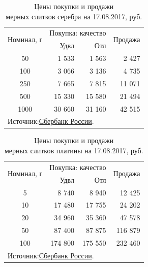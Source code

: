 \documentclass[_Banking_p3.tex]{subfiles}
\begin{document}
\begin{frame}[shrink=25]
\begin{table}[htbp]
  \centering
  \caption{Цены покупки и продажи\\ мерных слитков серебра на 17.08.2017, руб.}
    \begin{tabular}{crrr}
    \toprule
   
	\multirow{2}[4]{*}{ Номинал, г} & \multicolumn{2}{c}{Покупка: качество} & 				\multirow{2}[4]{*}{Продажа} \\\cmidrule(lr){2-3}
          & Удвл  & Отл   &  \\
    \midrule
	50    & 1 533 & 1 563 & 2 427 \\
    100   & 3 066 & 3 136 & 4 735 \\
    250   & 7 665 & 7 815 & 11 071 \\
    500   & 15 330 & 15 580 & 21 494 \\
    1000  & 30 660 & 31 160 & 42 515 \\
    \bottomrule
    \multicolumn{4}{l}{Источник:\href{http://www.sberbank.ru/ru/person/contributions/values/metall}{Сбербанк России}.}
    \end{tabular}%
  \label{tab:silver_bar_prices}%
\end{table}%

\end{frame}
\begin{frame}
\begin{table}[htbp]
  \centering
  \caption{Цены покупки и продажи\\ мерных слитков платины на 17.08.2017, руб.}
    \begin{tabular}{crrr}
    \toprule
   
	\multirow{2}[4]{*}{ Номинал, г} & \multicolumn{2}{c}{Покупка: качество} & 				\multirow{2}[4]{*}{Продажа} \\\cmidrule(lr){2-3}
          & Удвл  & Отл   &  \\
    \midrule
    5     & 8 740 & 8 940 & 12 425 \\
    10    & 17 480 & 17 755 & 24 202 \\
    20    & 34 960 & 35 360 & 47 578 \\
    50    & 87 400 & 87 875 & 116 879 \\
    100   & 174 800 & 175 550 & 232 460 \\
    \bottomrule
    \multicolumn{4}{l}{Источник:\href{http://www.sberbank.ru/ru/person/contributions/values/metall}{Сбербанк России}.}
    \end{tabular}%
  \label{tab:platinum_bar_prices}%
\end{table}%

\end{frame}
\end{document}
